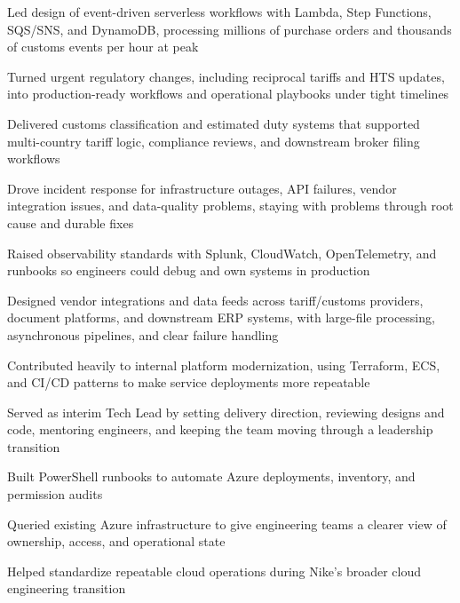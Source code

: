 \documentclass[10pt]{article}
\begin{document}
\begin{entryitems}
  \item Led design of event-driven serverless workflows with Lambda, Step Functions, SQS/SNS, and DynamoDB, processing millions of purchase orders and thousands of customs events per hour at peak
  \item Turned urgent regulatory changes, including reciprocal tariffs and HTS updates, into production-ready workflows and operational playbooks under tight timelines
  \item Delivered customs classification and estimated duty systems that supported multi-country tariff logic, compliance reviews, and downstream broker filing workflows
  \item Drove incident response for infrastructure outages, API failures, vendor integration issues, and data-quality problems, staying with problems through root cause and durable fixes
  \item Raised observability standards with Splunk, CloudWatch, OpenTelemetry, and runbooks so engineers could debug and own systems in production
  \item Designed vendor integrations and data feeds across tariff/customs providers, document platforms, and downstream ERP systems, with large-file processing, asynchronous pipelines, and clear failure handling
  \item Contributed heavily to internal platform modernization, using Terraform, ECS, and CI/CD patterns to make service deployments more repeatable
  \item Served as interim Tech Lead by setting delivery direction, reviewing designs and code, mentoring engineers, and keeping the team moving through a leadership transition
\end{entryitems}

\begin{entryitems}
  \item Built PowerShell runbooks to automate Azure deployments, inventory, and permission audits
  \item Queried existing Azure infrastructure to give engineering teams a clearer view of ownership, access, and operational state
  \item Helped standardize repeatable cloud operations during Nike's broader cloud engineering transition
\end{entryitems}
\end{document}
